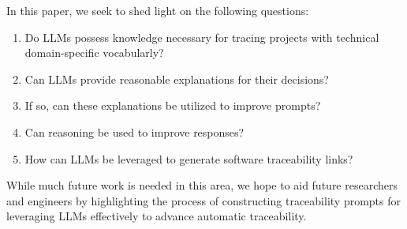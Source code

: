 In this paper, we seek to shed light on the following questions:
\begin{enumerate}
    \item Do LLMs possess knowledge necessary for tracing projects with technical domain-specific vocabularly?
    \item Can LLMs provide reasonable explanations for their decisions?
    \item If so, can these explanations be utilized to improve prompts?
    \item Can reasoning be used to improve responses?
    \item How can LLMs be leveraged to generate software traceability links?
\end{enumerate}

While much future work is needed in this area, we hope to aid future researchers and engineers by highlighting the process of constructing traceability prompts for leveraging LLMs effectively to advance automatic traceability. 